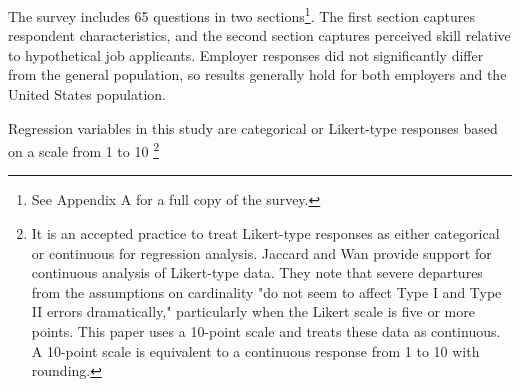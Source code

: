 \documentclass[review]{elsarticle}
\begin{document}
The survey includes 65 questions in two sections\footnote{See Appendix A for a full copy of the survey.}.
The first section captures respondent characteristics,
and the second section captures perceived skill relative to hypothetical job applicants.
Employer responses did not significantly differ from the general population,
so results generally hold for both employers and the United States population.

Regression variables in this study are categorical or Likert-type responses based on a scale from 1 to 10
\footnote{
    It is an accepted practice to treat Likert-type responses as either categorical or continuous for regression analysis.
    Jaccard and Wan provide support for continuous analysis of Likert-type data.
    They note that severe departures from the assumptions on cardinality "do not seem to affect Type I and Type II errors dramatically,"
    particularly when the Likert scale is five or more points\cite{jaccard1996lisrel}.
    This paper uses a 10-point scale and treats these data as continuous.
    A 10-point scale is equivalent to a continuous response from 1 to 10 with rounding.
}
\end{document}
